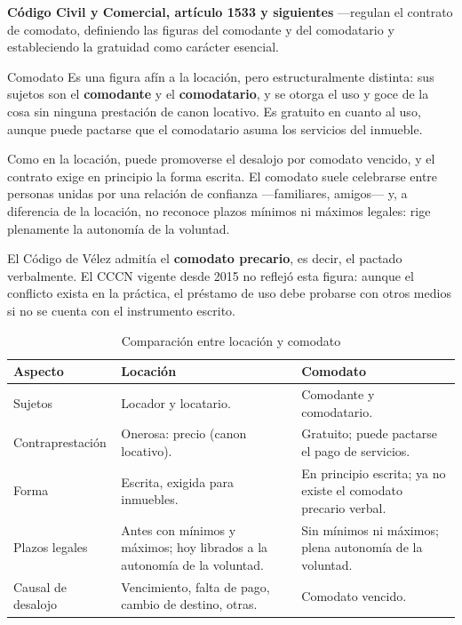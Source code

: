 \documentclass[12pt,oneside]{book}
\begin{document}
\begin{normacitada}
\textbf{Código Civil y Comercial, artículo 1533 y siguientes} ---regulan el contrato de comodato, definiendo las figuras del comodante y del comodatario y estableciendo la gratuidad como carácter esencial.
\end{normacitada}

\begin{definition}{Comodato}
Es una figura afín a la locación, pero estructuralmente distinta: sus sujetos son el \textbf{comodante} y el \textbf{comodatario}, y se otorga el uso y goce de la cosa sin ninguna prestación de canon locativo. Es gratuito en cuanto al uso, aunque puede pactarse que el comodatario asuma los servicios del inmueble.
\end{definition}

Como en la locación, puede promoverse el desalojo por comodato vencido, y el contrato exige en principio la forma escrita. El comodato suele celebrarse entre personas unidas por una relación de confianza ---familiares, amigos--- y, a diferencia de la locación, no reconoce plazos mínimos ni máximos legales: rige plenamente la autonomía de la voluntad.

\begin{important}
El Código de Vélez admitía el \textbf{comodato precario}, es decir, el pactado verbalmente. El CCCN vigente desde 2015 no reflejó esta figura: aunque el conflicto exista en la práctica, el préstamo de uso debe probarse con otros medios si no se cuenta con el instrumento escrito.
\end{important}

\begin{table}[H]
\centering
\caption{Comparación entre locación y comodato}
\begin{tabularx}{\textwidth}{>{\raggedright\arraybackslash}p{} X X}
\toprule
\textbf{Aspecto} & \textbf{Locación} & \textbf{Comodato} \\
\midrule
Sujetos & Locador y locatario. & Comodante y comodatario. \\
Contraprestación & Onerosa: precio (canon locativo). & Gratuito; puede pactarse el pago de servicios. \\
Forma & Escrita, exigida para inmuebles. & En principio escrita; ya no existe el comodato precario verbal. \\
Plazos legales & Antes con mínimos y máximos; hoy librados a la autonomía de la voluntad. & Sin mínimos ni máximos; plena autonomía de la voluntad. \\
Causal de desalojo & Vencimiento, falta de pago, cambio de destino, otras. & Comodato vencido. \\
\bottomrule
\end{tabularx}
\end{table}
\end{document}
